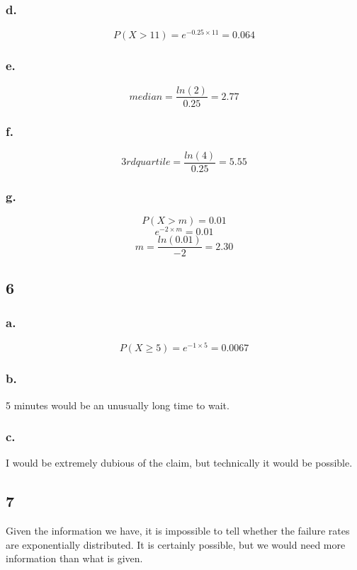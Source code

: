 \documentclass[11pt]{article}
\begin{document}
\subsubsection{d.}
\[ P(X > 11) = e^{-0.25 \times 11} = 0.064 \]
\subsubsection{e.}
\[ median = \frac{ln(2)}{0.25} = 2.77 \]
\subsubsection{f.}
\[ 3rd quartile = \frac{ln(4)}{0.25} = 5.55 \]
\subsubsection{g.}
\[ P(X > m) = 0.01 \]
\[ e^{-2 \times m} = 0.01 \]
\[ m = \frac{ln(0.01)}{-2} = 2.30 \]

\subsection{6}
\subsubsection{a.}
\[ P(X \ge 5) = e^{-1 \times 5} = 0.0067 \]
\subsubsection{b.}
5 minutes would be an unusually long time to wait. 
\subsubsection{c.}
I would be extremely dubious of the claim, but technically it would be possible.
\subsection{7}
Given the information we have, it is impossible to tell whether the failure
rates are exponentially distributed. It is certainly possible, but we would need
more information than what is given.
\end{document}
